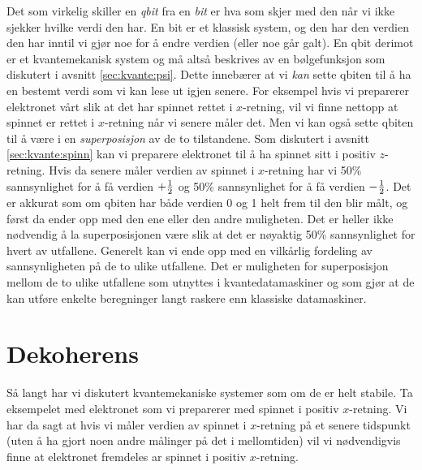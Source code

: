 Det som virkelig skiller en \emph{qbit} fra en \emph{bit} er hva som skjer med den når vi ikke sjekker hvilke verdi den har. En bit er et klassisk system, og den har den verdien den har inntil vi gjør noe for å endre verdien (eller noe går galt). En qbit derimot er et kvantemekanisk system og må altså beskrives av en bølgefunksjon som diskutert i avsnitt \ref{sec:kvante:psi}. Dette innebærer at vi \emph{kan} sette qbiten til å ha en bestemt verdi som vi kan lese ut igjen senere. For eksempel hvis vi preparerer elektronet vårt slik at det har spinnet rettet i $x$-retning, vil vi finne nettopp at spinnet er rettet i $x$-retning når vi senere måler det. Men vi kan også sette qbiten til å være i en \emph{superposisjon} av de to tilstandene. Som diskutert i avsnitt \ref{sec:kvante:spinn} kan vi preparere elektronet til å ha spinnet sitt i positiv $z$-retning. Hvis da senere måler verdien av spinnet i $x$-retning har vi 50\% sannsynlighet for å få verdien $+\frac{1}{2}$ og 50\% sannsynlighet for å få verdien $-\frac{1}{2}$. Det er akkurat som om qbiten har både verdien 0 og 1 helt frem til den blir målt, og først da ender opp med den ene eller den andre muligheten. Det er heller ikke nødvendig å la superposisjonen være slik at det er nøyaktig 50\% sannsynlighet for hvert av utfallene. Generelt kan vi ende opp med en vilkårlig fordeling av sannsynligheten på de to ulike utfallene. Det er muligheten for superposisjon mellom de to ulike utfallene som utnyttes i kvantedatamaskiner og som gjør at de kan utføre enkelte beregninger langt raskere enn klassiske datamaskiner. 

\section{Dekoherens}
Så langt har vi diskutert kvantemekaniske systemer som om de er helt stabile. Ta eksempelet med elektronet som vi preparerer med spinnet i positiv $x$-retning. Vi har da sagt at hvis vi måler verdien av spinnet i $x$-retning på et senere tidspunkt (uten å ha gjort noen andre målinger på det i mellomtiden) vil vi nødvendigvis finne at elektronet fremdeles ar spinnet i positiv $x$-retning. 
